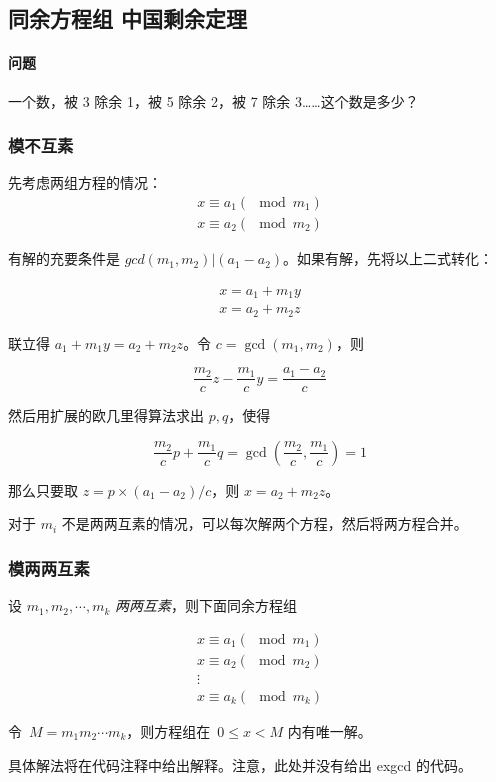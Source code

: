 \subsection{同余方程组 中国剩余定理}
	\paragraph{问题} 一个数，被 3 除余 1，被 5 除余 2，被 7 除余 3\ldots\ldots{}这个数是多少？

    \subsubsection{模不互素}
	    先考虑两组方程的情况：
	    \[ \begin{array}{l}
	    x \equiv a_1 (\mod m_1)		\\
	    x \equiv a_2 (\mod m_2)				
	    \end{array} \]
	    
	    有解的充要条件是 $gcd(m_1, m_2) | (a_1-a_2)$。如果有解，先将以上二式转化：
	    
	    \[ \begin{array}{l}
	    x = a_1 + m_1 y	\\
	    x = a_2 + m_2 z
	    \end{array} \]
	    
	    联立得 $a_1 + m_1 y = a_2 + m_2 z$。令 $c=\gcd(m_1, m_2)$，则
	    
	    \[
	    \frac{m_2}{c}z - \frac{m_1}{c}y = \frac{a_1-a_2}{c}
	    \]
	    
	    然后用扩展的欧几里得算法求出 $p,q$，使得
	    
	    \[
	    \frac{m_2}{c}p + \frac{m_1}{c}q = \gcd(\frac{m_2}{c},\frac{m_1}{c})=1
	    \]
	    
	    那么只要取 $z=p\times(a_1-a_2)/c$，则 $x=a_2+m_2z$。
	    
	    对于 $m_i$ 不是两两互素的情况，可以每次解两个方程，然后将两方程合并。
	    
    \subsubsection{模两两互素}
		设 $m_1, m_2, \cdots, m_k$ \emph{两两互素}，则下面同余方程组
		
		\[	\begin{array}{c}
		x \equiv a_1 (\mod m_1)	\\
		x \equiv a_2 (\mod m_2)	\\
		\vdots				\\
		x \equiv a_k (\mod m_k)
		\end{array} \]
		
		令~$M=m_1m_2\cdots{}m_k$，则方程组在~$0 \leqslant x < M$ 内有唯一解。				
		
		具体解法将在代码注释中给出解释。注意，此处并没有给出 exgcd 的代码。
		
		